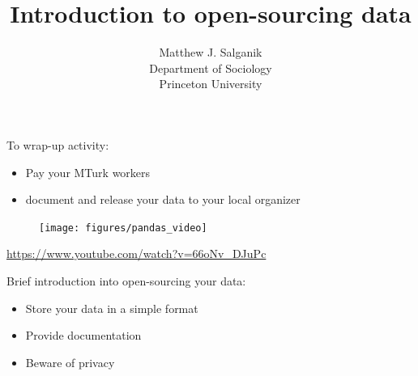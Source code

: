 \documentclass[aspectratio=169]{beamer}
\title[]{Introduction to open-sourcing data}
\author[]{Matthew J. Salganik\\Department of Sociology\\Princeton University}
\date[]{Summer Institutes in Computational Social Science\\June 20, 2019
\vfill
\begin{flushleft}
{\scriptsize
The Summer Institutes in Computational Social Science is supported by grants from the Russell Sage Foundation and the Alfred P. Sloan Foundation.}
\end{flushleft}
\begin{flushright}
\texttt{[image: figures/cc-by.png]}
\end{flushright}
}
\begin{document}
\frame{\titlepage}
\begin{frame}

To wrap-up activity:
\begin{itemize}
\item Pay your MTurk workers
\item document and release your data to your local organizer
\end{itemize}

\end{frame}
\begin{frame}

\begin{figure}
  \centering
  \texttt{[image: figures/pandas\_video]}
\end{figure}

\url{https://www.youtube.com/watch?v=66oNv_DJuPc}

\end{frame}
\begin{frame}

Brief introduction into open-sourcing your data:
\begin{itemize}
\item Store your data in a simple format
\pause
\item Provide documentation
\pause
\item Beware of privacy
\end{itemize}

\end{frame}
\end{document}
